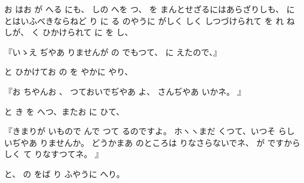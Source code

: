 
お
はお
が
へる
にも、
しの
へを
つ、
を
まんとせざるにはあらざりしも、
に
とはいふべきならねど
り
に
る
のやうに
がしく
しく
しつづけられて
を
れ
ね
しが、
く
ひかけられて
に
を
し、

『いゝえ
ぢやあ
りませんが
の
でもつて、
に
えたので、』

と
ひかけてお
の
を
やかに
やり、

『お
ちやんお
、
つておいでぢやあ
よ、
さんぢやあ
いかネ。
』

と
き
を
へつ、またお
に
ひて、

『きまりが
いもので
んで
つて
るのですよ。
ホヽヽまだ
くつて、いつそ
らしいぢやあ
りませんか。
どうかまあ
のところは
りなさらないでネ、
が
ですから
しく
て
りなすつてネ。
』

と、
の
をば
り
ふやうに
へり。

